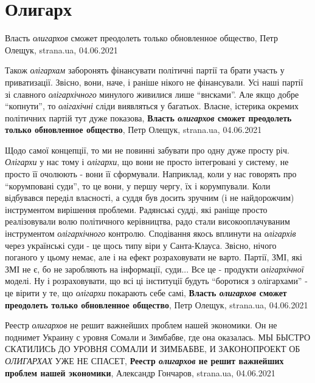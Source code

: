  
 
 
 
 
\chapter{Олигарх}

Власть \emph{олигархов} сможет преодолеть только обновленное общество,
Петр Олещук, strana.ua, 04.06.2021

Також \emph{олігархам} заборонять фінансувати політичні партії та брати участь у
приватизації. Звісно, вони, наче, і раніше нікого не фінансували. Усі наші
партії зі славного \emph{олігархічного} минулого живилися лише \enquote{внсками}. Але якщо
добре \enquote{копнути}, то \emph{олігахічні} сліди виявляться у багатьох. Власне, істерика
окремих політичних партій тут дуже показова,
\textbf{Власть \emph{олигархов} сможет преодолеть только обновленное общество},
Петр Олещук, strana.ua, 04.06.2021

Щодо самої концепції, то ми не повинні забувати про одну дуже просту річ.
\emph{Олігархи} у нас тому і \emph{олігархи}, що вони не просто інтегровані у систему, не
просто її очолюють - вони її сформували. Наприклад, коли у нас говорять про
\enquote{корумповані суди}, то це вони, у першу чергу, їх і корумпували. Коли
відбувався переділ власності, а суддя був досить зручним (і не найдорожчим)
інструментом вирішення проблеми. Радянські судді, які раніще просто
реалізовували волю політичного керівництва, радо стали високооплачуваним
інструментом \emph{олігархічного} контролю.  Сподівання якось вплинути на \emph{олігархів}
через українські суди - це щось типу віри у Санта-Клауса. Звісно, нічого
поганого у цьому немає, але і на ефект розраховувати не варто. Партії, ЗМІ, які
ЗМІ не є, бо не заробляють на інформації, суди... Все це - продукти
\emph{олігархічної} моделі. Ну і розраховувати, що всі ці інституції будуть
\enquote{боротися з олігархами} - це вірити у те, що \emph{олігархи} покарають себе
самі,
\textbf{Власть \emph{олигархов} сможет преодолеть только обновленное общество},
Петр Олещук, strana.ua, 04.06.2021

Реестр \emph{олигархов} не решит важнейших проблем нашей экономики.  Он не
поднимет Украину с уровня Сомали и Зимбабве, где она оказалась.  МЫ БЫСТРО
СКАТИЛИСЬ ДО УРОВНЯ СОМАЛИ И ЗИМБАБВЕ, И ЗАКОНОПРОЕКТ ОБ \emph{ОЛИГАРХАХ} УЖЕ
НЕ СПАСЕТ,
\textbf{Реестр \emph{олигархов} не решит важнейших проблем нашей экономики},
Александр Гончаров, strana.ua, 04.06.2021

